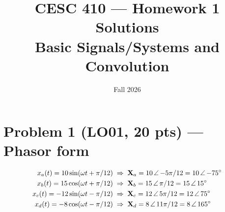



\title{\vspace{-1.5cm}CESC 410 --- Homework 1 Solutions\\
       {\large Basic Signals/Systems and Convolution}}
\author{}
\date{Fall 2026}


\maketitle
\vspace{-1.2cm}

\section*{Problem 1 \normalsize(LO01, 20 pts) --- Phasor form}

\begin{align*}
  x_a(t) = 10\sin(\omega t + \pi/12)  &\;\Rightarrow\; \mathbf{X}_a = 10\,\angle\,\mathord{-5\pi/12} = 10\,\angle\,\mathord{-75^\circ} \\
  x_b(t) = 15\cos(\omega t + \pi/12)  &\;\Rightarrow\; \mathbf{X}_b = 15\,\angle\,\mathord{\pi/12}   = 15\,\angle\,\mathord{15^\circ}  \\
  x_c(t) = -12\sin(\omega t - \pi/12) &\;\Rightarrow\; \mathbf{X}_c = 12\,\angle\,\mathord{5\pi/12}  = 12\,\angle\,\mathord{75^\circ}  \\
  x_d(t) = -8\cos(\omega t - \pi/12)  &\;\Rightarrow\; \mathbf{X}_d = 8\,\angle\,\mathord{11\pi/12}  = 8\,\angle\,\mathord{165^\circ}
\end{align*}

